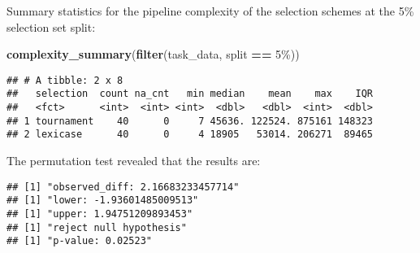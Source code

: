 \documentclass[
]{book}
\newenvironment{Shaded}{\begin{snugshade}}{\end{snugshade}}
\newcommand{\AttributeTok}[1]{\textcolor[rgb]{0.13,0.29,0.53}{#1}}
\newcommand{\DecValTok}[1]{\textcolor[rgb]{0.00,0.00,0.81}{#1}}
\newcommand{\FunctionTok}[1]{\textcolor[rgb]{0.13,0.29,0.53}{\textbf{#1}}}
\newcommand{\NormalTok}[1]{#1}
\newcommand{\OtherTok}[1]{\textcolor[rgb]{0.56,0.35,0.01}{#1}}
\newcommand{\SpecialCharTok}[1]{\textcolor[rgb]{0.81,0.36,0.00}{\textbf{#1}}}
\newcommand{\StringTok}[1]{\textcolor[rgb]{0.31,0.60,0.02}{#1}}
\begin{document}
Summary statistics for the pipeline complexity of the selection schemes at the 5\% selection set split:

\begin{Shaded}
\begin{Highlighting}[]
\FunctionTok{complexity\_summary}\NormalTok{(}\FunctionTok{filter}\NormalTok{(task\_data, split }\SpecialCharTok{==} \StringTok{\textquotesingle{}5\%\textquotesingle{}}\NormalTok{))}
\end{Highlighting}
\end{Shaded}

\begin{verbatim}
## # A tibble: 2 x 8
##   selection  count na_cnt   min median    mean    max    IQR
##   <fct>      <int>  <int> <int>  <dbl>   <dbl>  <int>  <dbl>
## 1 tournament    40      0     7 45636. 122524. 875161 148323
## 2 lexicase      40      0     4 18905   53014. 206271  89465
\end{verbatim}

The permutation test revealed that the results are:

\begin{Shaded}
\end{Shaded}

\begin{verbatim}
## [1] "observed_diff: 2.16683233457714"
## [1] "lower: -1.93601485009513"
## [1] "upper: 1.94751209893453"
## [1] "reject null hypothesis"
## [1] "p-value: 0.02523"
\end{verbatim}
\end{document}
